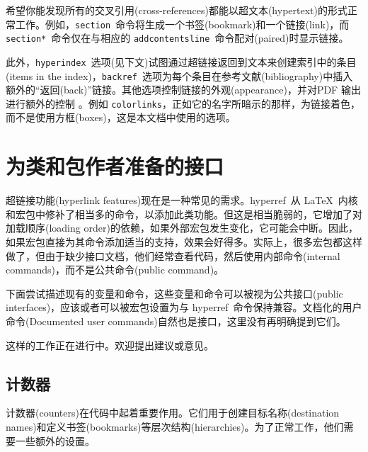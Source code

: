 \documentclass{article}
\newcommand*{\xpackage}[1]{\textsf{#1}}
\newcommand{\bs}{\symbol{'134}}%
\newcommand{\ci}[1]{\texttt{\bs#1}}
\begin{document}
希望你能发现所有的交叉引用(cross-references)都能以超文本(hypertext)的形式正常工作。例如，\ci{section}\ 命令将生成一个书签(bookmark)和一个链接(link)，而 \ci{section*}\ 命令仅在与相应的 \ci{addcontentsline}\ 命令配对(paired)时显示链接。

此外，\texttt{hyperindex}\ 选项(见下文)试图通过超链接返回到文本来创建索引中的条目(items in the index)，\texttt{backref}\ 选项为每个条目在参考文献(bibliography)中插入额外的“返回(back)”链接。其他选项控制链接的外观(appearance)，并对PDF 输出进行额外的控制 。例如 \texttt{colorlinks}，正如它的名字所暗示的那样，为链接着色，而不是使用方框(boxes)，这是本文档中使用的选项。

\newpage
\section{\heiti 为类和包作者准备的接口}

超链接功能(hyperlink features)现在是一种常见的需求。\xpackage{hyperref}\ 从 \LaTeX{}\ 内核和宏包中修补了相当多的命令，以添加此类功能。但这是相当脆弱的，它增加了对加载顺序(loading order)的依赖，如果外部宏包发生变化，它可能会中断。因此，如果宏包直接为其命令添加适当的支持，效果会好得多。实际上，很多宏包都这样做了，但由于缺少接口文档，他们经常查看代码，然后使用内部命令(internal commands)，而不是公共命令(public command)。

下面尝试描述现有的变量和命令，这些变量和命令可以被视为公共接口(public interfaces)，应该或者可以被宏包设置为与 \xpackage{hyperref}\ 命令保持兼容。文档化的用户命令(Documented user commands)自然也是接口，这里没有再明确提到它们。

这样的工作正在进行中。欢迎提出建议或意见。


\subsection[计数器]{\heiti 计数器}
计数器(counters)在代码中起着重要作用。它们用于创建目标名称(destination names)和定义书签(bookmarks)等层次结构(hierarchies)。为了正常工作，他们需要一些额外的设置。
\end{document}
